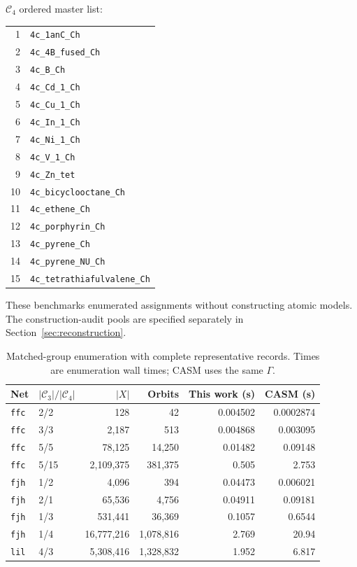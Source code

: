\documentclass[a5paper, 10pt]{article}
\begin{document}
\noindent $\mathcal{C}_{4}$ ordered master list:
\begin{center}\small
\begin{tabular}{rl}
1 & \texttt{4c\_1anC\_Ch} \\
2 & \texttt{4c\_4B\_fused\_Ch} \\
3 & \texttt{4c\_B\_Ch} \\
4 & \texttt{4c\_Cd\_1\_Ch} \\
5 & \texttt{4c\_Cu\_1\_Ch} \\
6 & \texttt{4c\_In\_1\_Ch} \\
7 & \texttt{4c\_Ni\_1\_Ch} \\
8 & \texttt{4c\_V\_1\_Ch} \\
9 & \texttt{4c\_Zn\_tet} \\
10 & \texttt{4c\_bicyclooctane\_Ch} \\
11 & \texttt{4c\_ethene\_Ch} \\
12 & \texttt{4c\_porphyrin\_Ch} \\
13 & \texttt{4c\_pyrene\_Ch} \\
14 & \texttt{4c\_pyrene\_NU\_Ch} \\
15 & \texttt{4c\_tetrathiafulvalene\_Ch} \\
\end{tabular}
\end{center}

These benchmarks enumerated assignments without constructing atomic models. The construction-audit pools are specified separately in Section~\ref{sec:reconstruction}.

\begin{table}[H]
\centering\scriptsize
\setlength{\tabcolsep}{1.2mm}
\caption{Matched-group enumeration with complete representative records. Times are enumeration wall times; CASM uses the same $\Gamma$.}
\label{tab:matched_extra}
\begin{tabular}{llrrrr}
\toprule
Net & $|\mathcal C_3|/|\mathcal C_4|$ & $|X|$ & Orbits & This work (s) & CASM (s) \\
\midrule
\texttt{ffc} & 2/2 & 128 & 42 & 0.004502 & 0.0002874 \\
\texttt{ffc} & 3/3 & 2,187 & 513 & 0.004868 & 0.003095 \\
\texttt{ffc} & 5/5 & 78,125 & 14,250 & 0.01482 & 0.09148 \\
\texttt{ffc} & 5/15 & 2,109,375 & 381,375 & 0.505 & 2.753 \\
\texttt{fjh} & 1/2 & 4,096 & 394 & 0.04473 & 0.006021 \\
\texttt{fjh} & 2/1 & 65,536 & 4,756 & 0.04911 & 0.09181 \\
\texttt{fjh} & 1/3 & 531,441 & 36,369 & 0.1057 & 0.6544 \\
\texttt{fjh} & 1/4 & 16,777,216 & 1,078,816 & 2.769 & 20.94 \\
\texttt{lil} & 4/3 & 5,308,416 & 1,328,832 & 1.952 & 6.817 \\
\bottomrule
\end{tabular}
\end{table}
\end{document}
